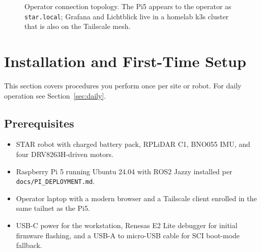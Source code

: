 \documentclass[11pt,letterpaper]{article}
\begin{document}
\begin{figure}[H]
\centering
{}
\caption{Operator connection topology. The Pi5 appears to the operator
as \texttt{star.local}; Grafana and Lichtblick live in a homelab k3s
cluster that is also on the Tailscale mesh.}
\label{fig:topology}
\end{figure}

\section{Installation and First-Time Setup}
\label{sec:install}

This section covers procedures you perform once per site or robot. For
daily operation see Section~\ref{sec:daily}.

\subsection{Prerequisites}
\begin{itemize}[leftmargin=1.4em,itemsep=2pt]
\item STAR robot with charged battery pack, RPLiDAR C1, BNO055 IMU,
      and four DRV8263H-driven motors.
\item Raspberry Pi 5 running Ubuntu 24.04 with ROS2 Jazzy installed
      per \texttt{docs/PI\_DEPLOYMENT.md}.
\item Operator laptop with a modern browser and a Tailscale client
      enrolled in the same tailnet as the Pi5.
\item USB-C power for the workstation, Renesas E2 Lite debugger for
      initial firmware flashing, and a USB-A to micro-USB cable for
      SCI boot-mode fallback.
\end{itemize}
\end{document}
